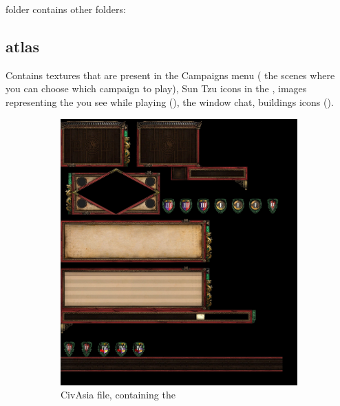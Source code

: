 \begin{appendices}
     folder contains other folders:

    \subsection{atlas} 

    Contains textures that are present in the Campaigns menu (\eg{} the scenes where you can choose which campaign to play), Sun Tzu icons in the , images representing the  you see while playing (), the window chat, buildings icons ().

    \begin{figure}
        \centering
        \begin{subfigure}{0.48\textwidth}
            \centering
            \includegraphics[width=1.0\textwidth]{src/images/CivAsia}
            \caption{CivAsia file, containing the }
            \label{fig:CivAsia}
        \end{subfigure}\quad%
        \begin{subfigure}{0.48\textwidth}
            \centering

\end{subfigure}
\end{figure}
\end{appendices}
